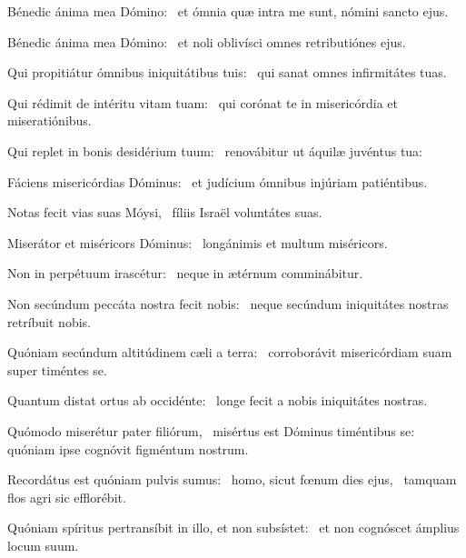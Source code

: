 \item Bénedic ánima mea Dómino:~\psstar{} et ómnia quæ intra me sunt, nómini sancto ejus.

\item Bénedic ánima mea Dómino:~\psstar{} et noli oblivísci omnes retributiónes ejus.

\item Qui propitiátur ómnibus iniquitátibus tuis:~\psstar{} qui sanat omnes infirmitátes tuas.

\item Qui rédimit de intéritu vitam tuam:~\psstar{} qui corónat te in misericórdia et miseratiónibus.

\item Qui replet in bonis desidérium tuum:~\psstar{} renovábitur ut áquilæ juvéntus tua:

\item Fáciens misericórdias Dóminus:~\psstar{} et judícium ómnibus injúriam patiéntibus.

\item Notas fecit vias suas Móysi,~\psstar{} fíliis Israël voluntátes suas.

\item Miserátor et miséricors Dóminus:~\psstar{} longánimis et multum miséricors.

\item Non in perpétuum irascétur:~\psstar{} neque in ætérnum comminábitur.

\item Non secúndum peccáta nostra fecit nobis:~\psstar{} neque secúndum iniquitátes nostras retríbuit nobis.

\item Quóniam secúndum altitúdinem cæli a terra:~\psstar{} corroborávit misericórdiam suam super timéntes se.

\item Quantum distat ortus ab occidénte:~\psstar{} longe fecit a nobis iniquitátes nostras.

\item Quómodo miserétur pater filiórum,~\pscross{} misértus est Dóminus timéntibus se:~\psstar{} quóniam ipse cognóvit figméntum nostrum.

\item Recordátus est quóniam pulvis sumus:~\pscross{} homo, sicut fœnum dies ejus,~\psstar{} tamquam flos agri sic efflorébit.

\item Quóniam spíritus pertransíbit in illo, et non subsístet:~\psstar{} et non cognóscet ámplius locum suum.

